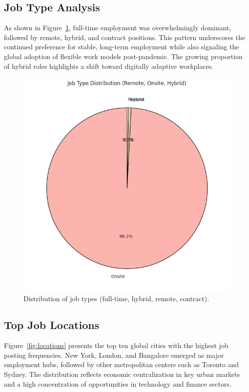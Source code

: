 \documentclass[conference]{IEEEtran}
\begin{document}
\subsection{Job Type Analysis}
As shown in Figure~\ref{fig:jobtype}, full-time employment was overwhelmingly dominant, followed by remote, hybrid, and contract positions. This pattern underscores the continued preference for stable, long-term employment while also signaling the global adoption of flexible work models post-pandemic. The growing proportion of hybrid roles highlights a shift toward digitally adaptive workplaces.

\begin{figure}[htbp]
    \centering
    \includegraphics[width=\linewidth]{fig 1.jpeg}
    \caption{Distribution of job types (full-time, hybrid, remote, contract).}
\label{fig:jobtype}
\end{figure}


\subsection{Top Job Locations}
Figure~\ref{fig:locations} presents the top ten global cities with the highest job posting frequencies. New York, London, and Bangalore emerged as major employment hubs, followed by other metropolitan centers such as Toronto and Sydney. The distribution reflects economic centralization in key urban markets and a high concentration of opportunities in technology and finance sectors.
\end{document}
